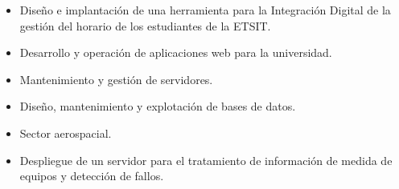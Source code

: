 \documentclass[10pt,a4paper,ragged2e]{altacv}
\begin{document}
\begin{itemize}
\item Diseño e implantación de una herramienta para la Integración Digital de la gestión del horario de los estudiantes de la ETSIT.   
\end{itemize}
\divider

\begin{itemize}
\item Desarrollo y operación de aplicaciones web para la universidad.   
\item Mantenimiento y gestión de servidores. 
\item Diseño, mantenimiento y explotación de bases de datos.
\end{itemize}
\divider

\begin{itemize}
\item Sector aerospacial.
\item Despliegue de un servidor para el tratamiento de información de medida de equipos y detección de fallos.  
\end{itemize}
\divider




%
\end{document}

